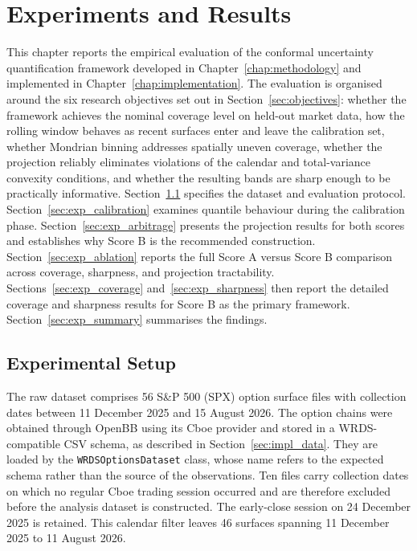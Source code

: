 \chapter{Experiments and Results}
\label{chap:results}

This chapter reports the empirical evaluation of the conformal uncertainty quantification framework developed in Chapter~\ref{chap:methodology} and implemented in Chapter~\ref{chap:implementation}. The evaluation is organised around the six research objectives set out in Section~\ref{sec:objectives}: whether the framework achieves the nominal coverage level on held-out market data, how the rolling window behaves as recent surfaces enter and leave the calibration set, whether Mondrian binning addresses spatially uneven coverage, whether the projection reliably eliminates violations of the calendar and total-variance convexity conditions, and whether the resulting bands are sharp enough to be practically informative. Section~\ref{sec:exp_setup} specifies the dataset and evaluation protocol. Section~\ref{sec:exp_calibration} examines quantile behaviour during the calibration phase. Section~\ref{sec:exp_arbitrage} presents the projection results for both scores and establishes why Score B is the recommended construction. Section~\ref{sec:exp_ablation} reports the full Score A versus Score B comparison across coverage, sharpness, and projection tractability. Sections~\ref{sec:exp_coverage} and~\ref{sec:exp_sharpness} then report the detailed coverage and sharpness results for Score B as the primary framework. Section~\ref{sec:exp_summary} summarises the findings.

\section{Experimental Setup}
\label{sec:exp_setup}

The raw dataset comprises 56 S\&P 500 (SPX) option surface files with collection dates between 11 December 2025 and 15 August 2026. The option chains were obtained through OpenBB using its Cboe provider and stored in a WRDS-compatible CSV schema, as described in Section~\ref{sec:impl_data}. They are loaded by the \texttt{WRDSOptionsDataset} class, whose name refers to the expected schema rather than the source of the observations. Ten files carry collection dates on which no regular Cboe trading session occurred and are therefore excluded before the analysis dataset is constructed. The early-close session on 24 December 2025 is retained. This calendar filter leaves 46 surfaces spanning 11 December 2025 to 11 August 2026.

